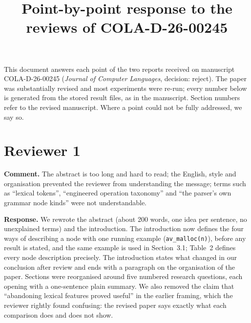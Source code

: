 \documentclass[11pt]{article}
\title{Point-by-point response to the reviews of COLA-D-26-00245}
\author{}
\date{}
\newcommand{\sect}[1]{Section~#1}
\begin{document}
\maketitle

This document answers each point of the two reports received on manuscript
COLA-D-26-00245 (\emph{Journal of Computer Languages}, decision: reject). The
paper was substantially revised and most experiments were re-run; every number
below is generated from the stored result files, as in the manuscript. Section
numbers refer to the revised manuscript. Where a point could not be fully
addressed, we say so.

\section*{Reviewer 1}
\textbf{Comment.} The abstract is too long and hard to read; the English, style
and organisation prevented the reviewer from understanding the message; terms
such as ``lexical tokens'', ``engineered operation taxonomy'' and ``the parser's
own grammar node kinds'' were not understandable.

\textbf{Response.} We rewrote the abstract (about 200 words, one idea per
sentence, no unexplained terms) and the introduction. The introduction now
defines the four ways of describing a node with one running example
(\texttt{av\_malloc(n)}), before any result is stated, and the same example is
used in \sect{3.1}; Table~2 defines every node description precisely. The
introduction states what changed in our conclusion after review and ends with a
paragraph on the organisation of the paper. Sections were reorganised around
five numbered research questions, each opening with a one-sentence plain
summary. We also removed the claim that ``abandoning lexical features proved
useful'' in the earlier framing, which the reviewer rightly found confusing: the
revised paper says exactly what each comparison does and does not show.
\end{document}
